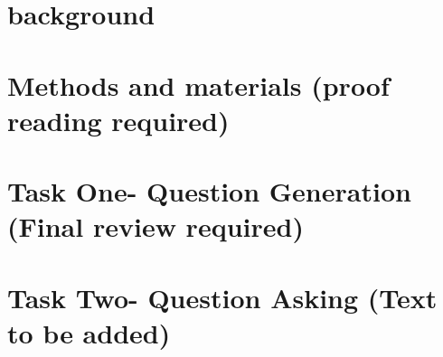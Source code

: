 \documentclass[11pt, a4paper]{article}
\begin{document}













\newpage

\section{background}
\label{sec:background}


\newpage

\section{Methods and materials (proof reading required)}
\label{sec:methods}


\newpage

\section{Task One- Question Generation (Final review required)}
\label{sec:task1}



\section{Task Two- Question Asking (Text to be added)}
\label{sec:task2}

\end{document}
